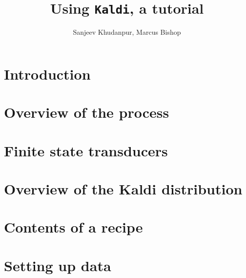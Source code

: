 \documentclass[12pt]{article}
\title{Using \texttt{Kaldi}, a tutorial}
\author{Sanjeev Khudanpur, Marcus Bishop}
\begin{document}
\maketitle

\section{Introduction}

\section{Overview of the process}

\section{Finite state transducers}

\section{Overview of the \textsf{Kaldi} distribution}

\section{Contents of a recipe}


\section{Setting up data}
\end{document}
